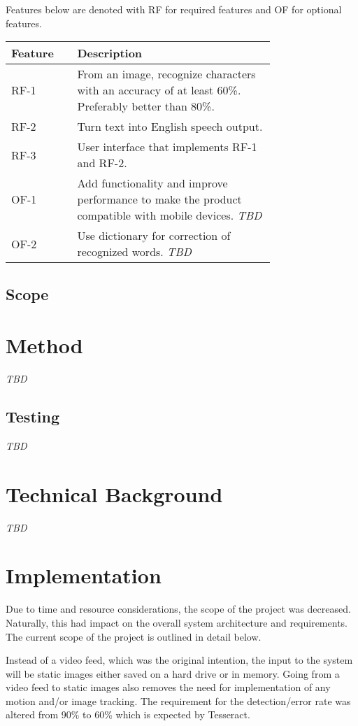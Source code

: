 \documentclass[a4paper, english]{scrartcl}
\begin{document}
Features below are denoted with RF for required features and OF for optional
features.
  \noindent\begin{tabularx}{\linewidth}{X p{0.75\linewidth}}
  \toprule
    \textbf{Feature} & \textbf{Description} \\
  \midrule
  RF-1 &
    From an image, recognize characters with an accuracy of at least 60\%.
    Preferably better than 80\%.\\
  RF-2 &
    Turn text into English speech output. \\
  RF-3 &
    User interface that implements RF-1 and RF-2. \\
  OF-1 &
    Add functionality and improve performance to make the product compatible
    with mobile devices. \textit{TBD} \\
  OF-2 &
    Use dictionary for correction of recognized words. \textit{TBD} \\
  \bottomrule
  \end{tabularx}
\subsection{Scope}

\section{Method}
\textit{TBD}

\subsection{Testing}
\textit{TBD}

\section{Technical Background}
\textit{TBD}

\section{Implementation}
Due to time and resource considerations, the scope of the project was decreased.
Naturally, this had impact on the overall system architecture and requirements.
The current scope of the project is outlined in detail below.

Instead of a video feed, which was the original intention, the input to the
system will be static images either saved on a hard drive or in memory. Going
from a video feed to static images also removes the need for implementation of
any motion and/or image tracking. The requirement for the detection/error rate
was altered from 90\% to 60\% which is expected by Tesseract.
\end{document}
